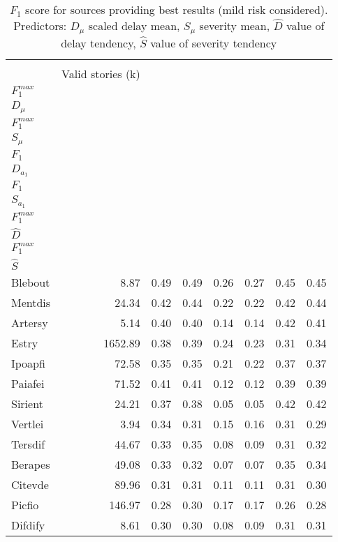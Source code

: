\begin{table}[htbp!] \centering
\caption{$F_1$ score for sources providing best results (mild risk considered). Predictors: $D_{\mu}$ scaled delay mean, $S_{\mu}$ severity mean, $\hat{D}$ value of delay tendency, $\hat{S}$ value of severity tendency}
\label{tab:312_F1_best_sources_mild_risk}
\begin{tabular}{lrrrrrrr}
\\[-1.8ex]\hline\hline \\[-1.8ex]
 & Valid stories (k) & \makecell{\textbf{$H_1$}\\$F_1^{max}$\\$D_{\mu}$} & \makecell{\textbf{$H_2$}\\$F_1^{max}$\\$S_{\mu}$} & \makecell{\textbf{$H_3$}\\$F_1$\\$D_{a_1}$} & \makecell{\textbf{$H_4$}\\$F_1$\\$S_{a_1}$} & \makecell{\textbf{$H_5$}\\$F_1^{max}$\\$\hat{D}$} & \makecell{\textbf{$H_6$}\\$F_1^{max}$\\$\hat{S}$} \\
\midrule
Blebout & 8.87 & 0.49 & 0.49 & 0.26 & 0.27 & 0.45 & 0.45 \\
Mentdis & 24.34 & 0.42 & 0.44 & 0.22 & 0.22 & 0.42 & 0.44 \\
Artersy & 5.14 & 0.40 & 0.40 & 0.14 & 0.14 & 0.42 & 0.41 \\
Estry & 1652.89 & 0.38 & 0.39 & 0.24 & 0.23 & 0.31 & 0.34 \\
Ipoapfi & 72.58 & 0.35 & 0.35 & 0.21 & 0.22 & 0.37 & 0.37 \\
Paiafei & 71.52 & 0.41 & 0.41 & 0.12 & 0.12 & 0.39 & 0.39 \\
Sirient & 24.21 & 0.37 & 0.38 & 0.05 & 0.05 & 0.42 & 0.42 \\
Vertlei & 3.94 & 0.34 & 0.31 & 0.15 & 0.16 & 0.31 & 0.29 \\
Tersdif & 44.67 & 0.33 & 0.35 & 0.08 & 0.09 & 0.31 & 0.32 \\
Berapes & 49.08 & 0.33 & 0.32 & 0.07 & 0.07 & 0.35 & 0.34 \\
Citevde & 89.96 & 0.31 & 0.31 & 0.11 & 0.11 & 0.31 & 0.30 \\
Picfio & 146.97 & 0.28 & 0.30 & 0.17 & 0.17 & 0.26 & 0.28 \\
Difdify & 8.61 & 0.30 & 0.30 & 0.08 & 0.09 & 0.31 & 0.31 \\

\end{tabular}
\end{table}
